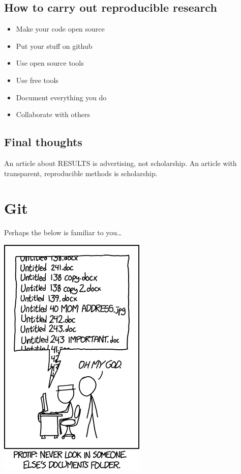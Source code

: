 \documentclass[
]{book}
\providecommand{\tightlist}{%
  \setlength{\itemsep}{0pt}\setlength{\parskip}{0pt}}
\begin{document}
\hypertarget{how-to-carry-out-reproducible-research}{%
\section*{How to carry out reproducible research}\label{how-to-carry-out-reproducible-research}}

\begin{itemize}
\tightlist
\item
  Make your code open source\\
\item
  Put your stuff on github\\
\item
  Use open source tools\\
\item
  Use free tools\\
\item
  Document everything you do\\
\item
  Collaborate with others
\end{itemize}

\hypertarget{final-thoughts}{%
\section*{Final thoughts}\label{final-thoughts}}

An article about RESULTS is advertising, not scholarship. An article with transparent, reproducible methods is scholarship.

\hypertarget{git}{%
\chapter{Git}\label{git}}

Perhaps the below is familiar to you\ldots{}

\includegraphics{img/version_control.png}
\end{document}
